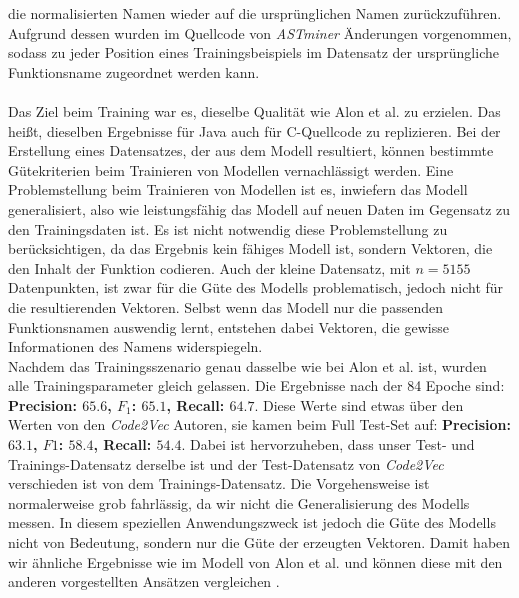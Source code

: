 \documentclass[12pt,letterpaper,ngerman]{article}
\begin{document}
die normalisierten Namen wieder auf die ursprünglichen 
Namen zurückzuführen.
Aufgrund dessen wurden im Quellcode von \textit{ASTminer} Änderungen
vorgenommen, sodass zu jeder Position eines Trainingsbeispiels im 
Datensatz der ursprüngliche Funktionsname zugeordnet werden kann. \\
\pagebreak
\hfill\\
Das Ziel beim Training war es, dieselbe Qualität wie Alon et al. zu erzielen. 
Das heißt, dieselben Ergebnisse für Java auch für C-Quellcode zu 
replizieren. Bei der Erstellung eines Datensatzes, der aus dem 
Modell resultiert, können bestimmte Gütekriterien beim Trainieren 
von Modellen vernachlässigt werden. Eine Problemstellung beim 
Trainieren von Modellen ist es, inwiefern das Modell generalisiert, 
also wie leistungsfähig das Modell auf neuen Daten im Gegensatz zu 
den Trainingsdaten ist.
Es ist nicht notwendig diese Problemstellung zu berücksichtigen,
da das 
Ergebnis kein fähiges Modell ist, sondern Vektoren, die den 
Inhalt der Funktion codieren.
Auch der kleine Datensatz, mit $n = 5155 $ Datenpunkten, ist zwar
für die Güte des Modells problematisch, jedoch nicht für die
resultierenden Vektoren. Selbst wenn das Modell nur 
die passenden Funktionsnamen auswendig lernt, entstehen dabei
Vektoren, die gewisse Informationen des Namens widerspiegeln.\\
Nachdem das Trainingsszenario 
genau dasselbe wie bei Alon et al. ist, wurden alle
Trainingsparameter gleich 
gelassen. Die Ergebnisse nach der 84 Epoche sind: 
{\bf Precision: $65.6$, $F_1$: $65.1$,  Recall: $64.7$}. Diese Werte sind 
etwas über den Werten von den \textit{Code2Vec} Autoren, sie kamen beim 
Full Test-Set auf: {\bf Precision: $63.1$, $F1$: $58.4$,  Recall: $54.4$}. 
Dabei ist hervorzuheben, dass unser Test- und Trainings-Datensatz derselbe ist
und der Test-Datensatz von \textit{Code2Vec} verschieden ist von dem 
Trainings-Datensatz. Die Vorgehensweise ist normalerweise grob fahrlässig,
da wir nicht die Generalisierung des Modells messen. In diesem speziellen 
Anwendungszweck ist jedoch die Güte des Modells nicht von Bedeutung,
sondern nur die Güte der erzeugten Vektoren.
Damit haben wir ähnliche Ergebnisse wie im Modell von Alon et al.
und können diese mit den anderen vorgestellten Ansätzen vergleichen
\cite{code2vec}.
\end{document}
